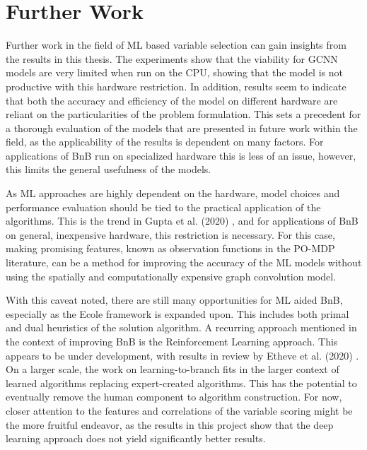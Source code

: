 \section{Further Work}\label{sec:disc_furtherwork}

Further work in the field of \gls{ML} based variable selection can gain insights from the results in this thesis.
The experiments show that the viability for \gls{GCNN} models are very limited when run on the \gls{CPU}, showing that the model is not productive with this hardware restriction. In addition, results seem to indicate that both the accuracy and efficiency of the model on different hardware are reliant on the particularities of the problem formulation. This sets a precedent for a thorough evaluation of the models that are presented in future work within the field, as the applicability of the results is dependent on many factors. For applications of \gls{BnB} run on specialized hardware this is less of an issue, however, this limits the general usefulness of the models. 

As \gls{ML} approaches are highly dependent on the hardware, model choices and performance evaluation should be tied to the practical application of the algorithms. This is the trend in Gupta et al. (2020) \cite{gupta2020hybrid}, and for applications of \gls{BnB} on general, inexpensive hardware, this restriction is necessary. For this case, making promising features, known as observation functions in the \gls{PO-MDP} literature, can be a method for improving the accuracy of the \gls{ML} models without using the spatially and computationally expensive graph convolution model. 

With this caveat noted, there are still many opportunities for \gls{ML} aided \gls{BnB}, especially as the \gls{Ecole} framework is expanded upon. This includes both primal and dual heuristics of the solution algorithm.
A recurring approach mentioned in the context of improving \gls{BnB} is the Reinforcement Learning approach. This appears to be under development, with results in review by Etheve et al. (2020) \cite{etheve2020reinforcement}. On a larger scale, the work on learning-to-branch fits in the larger context of learned algorithms replacing expert-created algorithms. This has the potential to eventually remove the human component to algorithm construction. For now, closer attention to the features and correlations of the variable scoring might be the more fruitful endeavor, as the results in this project show that the deep learning approach does not yield significantly better results. 


